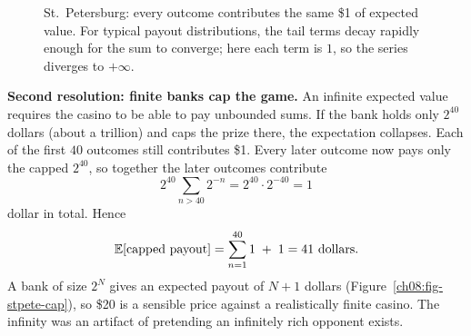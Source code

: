 \begin{figure}[H]
\centering
{}
\caption{St.\ Petersburg: every outcome contributes the same \$1 of expected
value. For typical payout distributions, the tail terms decay rapidly enough for
the sum to converge; here each term is $1$, so the series diverges to $+\infty$.}
\label{ch08:fig-stpete}
\end{figure}

\begin{happeningbox}
\textbf{Second resolution: finite banks cap the game.} An infinite expected value
requires the casino to be able to pay unbounded sums. If the bank holds only
$2^{40}$ dollars (about a trillion) and caps the prize there, the expectation
collapses. Each of the first $40$ outcomes still contributes \$1. Every later
outcome now pays only the capped $2^{40}$, so together the later outcomes contribute
\[
  2^{40}\sum_{n>40}2^{-n} = 2^{40}\cdot 2^{-40} = 1
\]
dollar in total. Hence
\[
  \operatorname{\mathbb{E}}[\text{capped payout}] = \sum_{n=1}^{40} 1 \;+\; 1 = 41 \text{ dollars}.
\]
A bank of size $2^N$ gives an expected payout of $N+1$ dollars
(Figure~\ref{ch08:fig-stpete-cap}), so \$20
is a sensible price against a realistically finite casino. The infinity
was an artifact of pretending an infinitely rich opponent exists.
\end{happeningbox}

